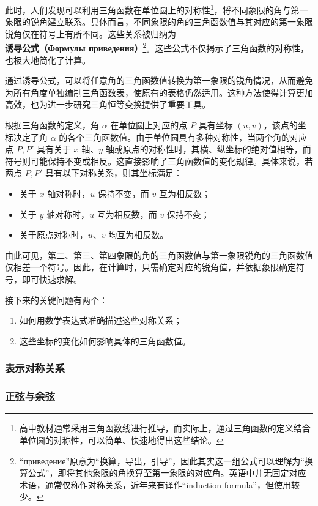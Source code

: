 此时，人们发现可以利用三角函数在单位圆上的对称性\footnote{高中教材通常采用三角函数线进行推导，而实际上，通过三角函数的定义结合单位圆的对称性，可以简单、快速地得出这些结论。}，将不同象限的角与第一象限的锐角建立联系。具体而言，不同象限的角的三角函数值与其对应的第一象限锐角仅在符号上有所不同。这些关系被归纳为\textbf{诱导公式（Формулы приведения）}\footnote{“приведение”原意为“换算，导出，引导”，因此其实这一组公式可以理解为“换算公式”，即将其他象限的角换算至第一象限的对应角。英语中并无固定对应术语，通常仅称作对称关系，近年来有译作“induction formula”，但使用较少。}。这些公式不仅揭示了三角函数的对称性，也极大地简化了计算。

通过诱导公式，可以将任意角的三角函数值转换为第一象限的锐角情况，从而避免为所有角度单独编制三角函数表，使原有的表格仍然适用。这种方法使得计算更加高效，也为进一步研究三角恒等变换提供了重要工具。

根据三角函数的定义，角 $\alpha$ 在单位圆上对应的点 $P$ 具有坐标 $(u,v)$，该点的坐标决定了角 $\alpha$ 的各个三角函数值。由于单位圆具有多种对称性，当两个角的对应点 $P, P'$ 具有关于 $x$ 轴、$y$ 轴或原点的对称性时，其横、纵坐标的绝对值相等，而符号则可能保持不变或相反。这直接影响了三角函数值的变化规律。具体来说，若两点 $P, P'$ 具有以下对称关系，则其坐标满足：
\begin{itemize}
\item 关于 $x$ 轴对称时，$u$ 保持不变，而 $v$ 互为相反数；
\item 关于 $y$ 轴对称时，$u$ 互为相反数，而 $v$ 保持不变；
\item 关于原点对称时，$u$、$v$ 均互为相反数。
\end{itemize}

由此可见，第二、第三、第四象限的角的三角函数值与第一象限锐角的三角函数值仅相差一个符号。因此，在计算时，只需确定对应的锐角值，并依据象限确定符号，即可快速求解。

接下来的关键问题有两个：
\begin{enumerate}
\item 如何用数学表达式准确描述这些对称关系；
\item 这些坐标的变化如何影响具体的三角函数值。
\end{enumerate}

\subsubsection{表示对称关系}



\subsubsection{正弦与余弦}


